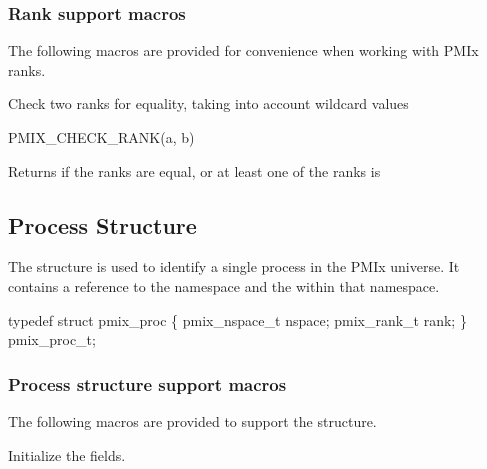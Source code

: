 \subsubsection{Rank support macros}

The following macros are provided for convenience when working with \ac{PMIx} ranks.


Check two ranks for equality, taking into account wildcard values

\cspecificstart
\begin{codepar}
PMIX_CHECK_RANK(a, b)
\end{codepar}
\cspecificend

\begin{arglist}
\end{arglist}

Returns  if the ranks are equal, or at least one of the ranks is 

\subsection{Process Structure}

The  structure is used to identify a single process in the PMIx universe.
It contains a reference to the namespace and the  within that namespace.

\cspecificstart
\begin{codepar}
typedef struct pmix_proc \{
    pmix_nspace_t nspace;
    pmix_rank_t rank;
\} pmix_proc_t;
\end{codepar}
\cspecificend

\subsubsection{Process structure support macros}
The following macros are provided to support the  structure.


Initialize the  fields.

